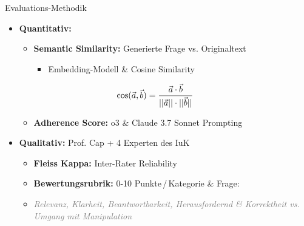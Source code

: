 \documentclass[usenames, dvipsnames, aspectratio=32]{beamer}
\begin{document}
\begin{frame}[allowframebreaks]{Evaluations-Methodik}
    \begin{itemize}
        \item \textbf{Quantitativ:}
        \begin{itemize}
            \item \textbf{Semantic Similarity:} Generierte Frage vs. Originaltext
            \begin{itemize}
                \item[$\to$] Embedding-Modell \& Cosine Similarity \vspace{-.6em}
            \end{itemize}
            \begin{align*}
                \hspace{-3em}\cos(\vec{a}, \vec{b}) &= \frac{\vec{a} \cdot \vec{b}}{||\vec{a}|| \cdot ||\vec{b}||} 
            \end{align*}
            \item \textbf{Adherence Score:} o3 \& Claude 3.7 Sonnet Prompting
        \end{itemize}
        \item \textbf{Qualitativ:} Prof. Cap + 4 Experten des IuK 
        \begin{itemize}
            \item \textbf{Fleiss Kappa:} Inter-Rater Reliability
            \item \textbf{Bewertungsrubrik:} 0-10 Punkte\,/\,Kategorie \& Frage:
            \item[] \textit{\textcolor{gray}{Relevanz, Klarheit, Beantwortbarkeit, Herausfordernd \& Korrektheit vs. Umgang mit Manipulation}}
        \end{itemize}
    \end{itemize}
\end{frame}
\end{document}
